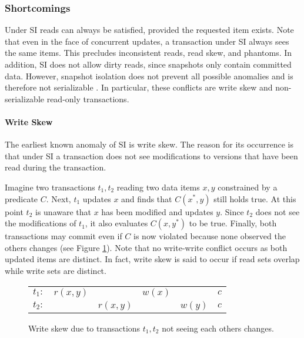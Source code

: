 
\subsubsection{Shortcomings}

Under SI reads can always be satisfied, provided the requested item exists. Note
that even in the face of concurrent updates, a transaction under SI always sees
the same items. This precludes inconsistent reads, read skew, and phantoms. In
addition, SI does not allow dirty reads, since snapshots only contain committed
data. However, snapshot isolation does not prevent all possible anomalies and is
therefore not serializable \cite{berenson1995critique, fekete2004read}. In
particular, these conflicts are write skew and non-serializable read-only
transactions.

\paragraph{Write Skew}

The earliest known anomaly of SI is write skew. The reason for its occurrence is
that under SI a transaction does not see modifications to versions that have
been read during the transaction.

Imagine two transactions $t_1, t_2$ reading two data items $x, y$ constrained by
a predicate $C$. Next, $t_1$ updates $x$ and finds that $C(x^{*}, y)$ still
holds true. At this point $t_2$ is unaware that $x$ has been modified and
updates $y$. Since $t_2$ does not see the modifications of $t_1$, it also
evaluates $C(x, y^{*})$ to be true. Finally, both transactions may commit even
if $C$ is now violated because none observed the others changes (see Figure
\ref{fig:write_skew}). Note that no write-write conflict occurs as both updated
items are distinct. In fact, write skew is said to occur if read sets overlap
while write sets are distinct.

\begin{figure}[!h]
    \centering
    \begin{tabular}{r c c c c c}
        $t_1:$ & $r(x,y)$ &          & $w(x)$ &        & $c$ \\
        $t_2:$ &          & $r(x,y)$ &        & $w(y)$ & $c$ \\
    \end{tabular}
    \caption{Write skew due to transactions $t_1, t_2$ not seeing each others changes.}
    \label{fig:write_skew}
\end{figure}

